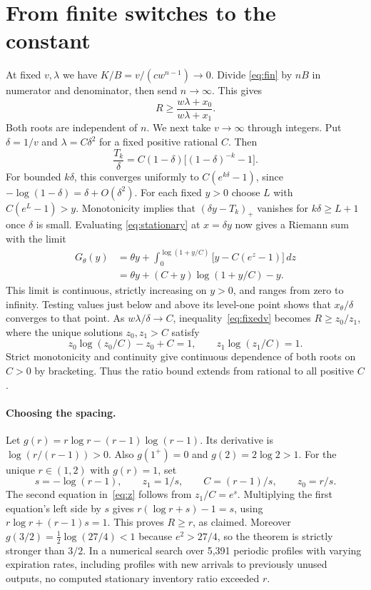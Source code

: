 \documentclass[11pt,letterpaper]{article}
\begin{document}
\section{From finite switches to the constant}\label{sec:limit}
At fixed $v,\lambda$ we have $K/B=v/(cw^{n-1})\to0$. Divide \eqref{eq:fin} by $nB$ in numerator and denominator, then send $n\to\infty$. This gives
\begin{equation}
 R\ge \frac{w\lambda+x_0}{w\lambda+x_1}.\label{eq:fixedv}
\end{equation}
Both roots are independent of $n$. We next take $v\to\infty$ through integers. Put $\delta=1/v$ and $\lambda=C\delta^2$ for a fixed positive rational $C$. Then
\[
 \frac{T_k}{\delta}=C(1-\delta)\big[(1-\delta)^{-k}-1\big].
\]
For bounded $k\delta$, this converges uniformly to $C(e^{k\delta}-1)$, since $-\log(1-\delta)=\delta+O(\delta^2)$. For each fixed $y>0$ choose $L$ with $C(e^L-1)>y$. Monotonicity implies that $(\delta y-T_k)_+$ vanishes for $k\delta\ge L+1$ once $\delta$ is small. Evaluating \eqref{eq:stationary} at $x=\delta y$ now gives a Riemann sum with the limit
\begin{align*}
 G_\theta(y)
 &=\theta y+\int_0^{\log(1+y/C)}\!\big[y-C(e^z-1)\big]\,dz\\
 &=\theta y+(C+y)\log(1+y/C)-y .
\end{align*}
This limit is continuous, strictly increasing on $y>0$, and ranges from zero to infinity. Testing values just below and above its level-one point shows that $x_\theta/\delta$ converges to that point. As $w\lambda/\delta\to C$, inequality~\eqref{eq:fixedv} becomes $R\ge z_0/z_1$, where the unique solutions $z_0,z_1>C$ satisfy
\begin{equation}
 z_0\log(z_0/C)-z_0+C=1,\qquad z_1\log(z_1/C)=1.\label{eq:z}
\end{equation}
Strict monotonicity and continuity give continuous dependence of both roots on $C>0$ by bracketing. Thus the ratio bound extends from rational to all positive $C$.

\paragraph{Choosing the spacing.}
Let $g(r)=r\log r-(r-1)\log(r-1)$. Its derivative is $\log(r/(r-1))>0$. Also $g(1^+)=0$ and $g(2)=2\log2>1$. For the unique $r\in(1,2)$ with $g(r)=1$, set
\[
 s=-\log(r-1),\qquad z_1=1/s,\qquad C=(r-1)/s,\qquad z_0=r/s .
\]
The second equation in~\eqref{eq:z} follows from $z_1/C=e^s$. Multiplying the first equation's left side by $s$ gives $r(\log r+s)-1=s$, using $r\log r+(r-1)s=1$. This proves $R\ge r$, as claimed. Moreover $g(3/2)=\tfrac12\log(27/4)<1$ because $e^2>27/4$, so the theorem is strictly stronger than $3/2$. In a numerical search over 5,391 periodic profiles with varying expiration rates, including profiles with new arrivals to previously unused outputs, no computed stationary inventory ratio exceeded $r$.
\end{document}
